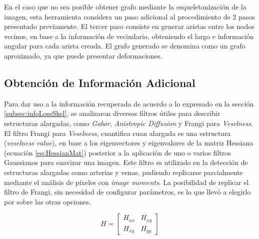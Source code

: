 
En el caso que no sea posible obtener grafo mediante la esqueletonizaci\'on de la imagen, esta herramienta considera un paso adicional al procedimiento de 2 pasos presentado previamente. El tercer paso consiste en generar aristas entre los nodos vecinos, en base a la informaci\'on de vecindario, obteniendo el largo e informaci\'on angular para cada arista creada. El grafo generado se denomina como un grafo aproximado, ya que puede presentar deformaciones.


\subsection{Obtenci\'on de Informaci\'on Adicional}

Para dar uso a la informaci\'on recuperada de acuerdo a lo expresado en la secci\'on \ref{subsec:infoLossSkel}, se analizaron diversos filtros \'utiles para describir estructuras alargadas, como {\it Gabor}, {\it Anistropic Diffusion} y Frangi para {\it Veselness}. El filtro Frangi para {\it Veselness}\cite{frangi1998multiscale}\cite{fu2018frangi}, cuantifica cuan alargada es una estructura ({\it veselness value}), en base a los eigenvectores y eigenvalores de la matriz Hessiana (ecuaci\'on \eqref{eq:HessianMat}) posterior a la aplicaci\'on de uno o varios filtros Gaussianos para suavizar una imagen. Este filtro es utilizado en la detecci\'on de estructuras alargadas como arterias y venas, pudiendo replicarse parcialmente mediante el an\'alisis de p\'ixeles con {\it image moments}\cite{flusser2009moments}. La posibilidad de replicar el filtro de Frangi, sin necesidad de configurar par\'ametros, es lo que llev\'o a elegirlo por sobre las otras opciones.

\begin{equation}
    \label{eq:HessianMat}
    H = \begin{bmatrix}
        H_{xx} & H_{xy} \\
        H_{xy} & H_{yy} 
        \end{bmatrix}
\end{equation}

